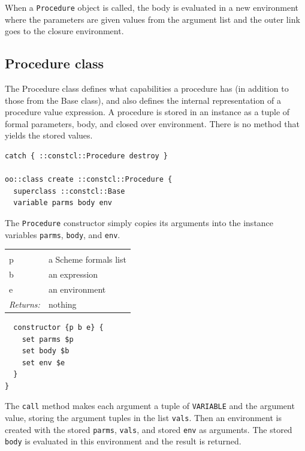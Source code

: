 \documentclass[twoside]{report}
\begin{document}
When a \texttt{Procedure} object is called, the body is evaluated in a new environment where the parameters are given values from the argument list and the outer link goes to the closure environment.

\subsection{Procedure class}
\label{procedure-class}

The Procedure class defines what capabilities a procedure has (in addition to those from the Base class), and also defines the internal representation of a procedure value expression. A procedure is stored in an instance as a tuple of formal parameters, body, and closed over environment. There is no method that yields the stored values.

\begin{lstlisting}
catch { ::constcl::Procedure destroy }

oo::class create ::constcl::Procedure {
  superclass ::constcl::Base
  variable parms body env
\end{lstlisting}

The \texttt{Procedure} constructor simply copies its arguments into the instance variables \texttt{parms}, \texttt{body}, and \texttt{env}.

\noindent\begin{tabular}{ |p{1.9cm} p{8cm}| }
\hline
\rowcolor[HTML]{CCCCCC} \multicolumn{2}{|l|}{\bf Procedure constructor (internal)} \\
p & a Scheme formals list \\
b & an expression \\
e & an environment \\
\textit{Returns:} & nothing \\
\hline
\end{tabular}

\begin{lstlisting}
  constructor {p b e} {
    set parms $p
    set body $b
    set env $e
  }
}
\end{lstlisting}

The \texttt{call} method makes each argument a tuple of \texttt{VARIABLE} and the argument value, storing the argument tuples in the list \texttt{vals}. Then an environment is created with the stored \texttt{parms}, \texttt{vals}, and stored \texttt{env} as arguments. The stored \texttt{body} is evaluated in this environment and the result is returned.
\end{document}
